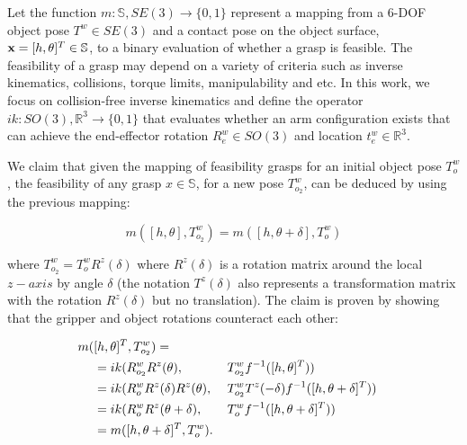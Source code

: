 \documentclass{aamas2015}
\begin{document}
Let the function $m: \mathbb{S}, SE(3) \rightarrow \{0,1\}$ represent a mapping from a 6-DOF object
pose $T^w \in SE(3)$ and a contact pose on the object surface, $\textbf{x} = [h, \theta]^T \in \mathbb{S}$,
to a binary evaluation of whether a grasp is feasible. The feasibility of a grasp may depend on a variety
of criteria such as inverse kinematics, collisions, torque limits, manipulability and etc. In this work,
we focus on collision-free inverse kinematics and define the operator $ik: SO(3), \mathbb{R}^3 \rightarrow \{0,1\}$
that evaluates whether an arm configuration exists that can achieve the end-effector rotation $R^w_e \in SO(3)$ and location $t^w_e \in \mathbb{R}^3$. 

We claim that given the mapping of feasibility grasps for an initial object pose $T^w_o$, the feasibility of any 
grasp $x \in \mathbb{S}$, for a new pose $T^w_{o_2}$, can be deduced by using the previous mapping:

\begin{equation}
  m([h,\theta],T^w_{o_2}) = m([h,\theta+\delta], T^w_o)
\end{equation}

\noindent where $T^w_{o_2} = T^w_o R^z(\delta)$ where $R^z(\delta)$ is a rotation matrix around the
local $z-axis$ by angle $\delta$ (the notation $T^z(\delta)$ also represents a
transformation matrix with the rotation $R^z(\delta)$ but no translation). The claim is proven
by showing that the gripper and object rotations counteract each other:

\begin{alignat}{2}
  m(&[h,\theta]^T,T^w_{o_2}) 	=	\notag \\
				&= ik(R^w_{o_2} R^z(\theta), 			&&T^w_{o_2} f^{-1}([h,\theta]^T)) \\
				&= ik(R^w_o R^z(\delta) R^z(\theta), 		~&&T^w_{o_2} T^z(-\delta) f^{-1}([h,\theta+\delta]^T)) \label{eq:proof_key} \\
				&= ik(R^w_o R^z(\theta+\delta), 		&&T^w_o f^{-1}([h,\theta+\delta]^T)) \\
				&= m([h,\theta+\delta]^T, T^w_o). 				
\end{alignat}
\end{document}
